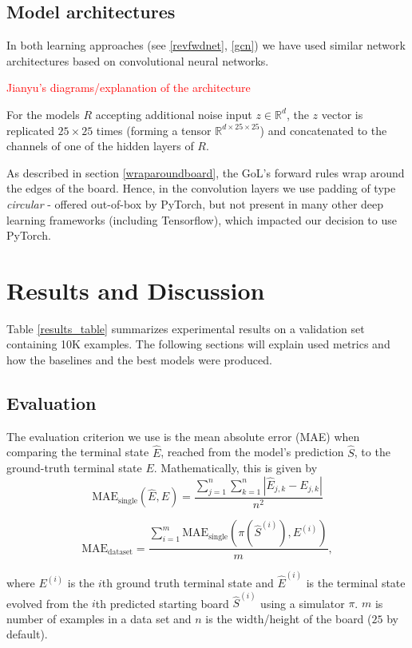 \documentclass[conference]{IEEEtran}
\newcommand\todo[1]{\textcolor{red}{#1}}
\begin{document}
\subsection{Model architectures}
In both learning approaches (see \ref{revfwdnet}, \ref{gcn}) we have used similar network architectures based on convolutional neural networks.

\todo{Jianyu's diagrams/explanation of the architecture}

For the models $R$ accepting additional noise input $z \in \mathbb{R}^d$, the $z$ vector is replicated $25 \times 25$ times (forming a tensor $\mathbb{R}^{d\times25\times25}$) and concatenated to the channels of one of the hidden layers of $R$.

As described in section \ref{wraparoundboard}, the GoL's forward rules wrap around the edges of the board. Hence, in the convolution layers we use padding of type {\it circular} - offered out-of-box by PyTorch, but not present in many other deep learning frameworks (including Tensorflow), which impacted our decision to use PyTorch.


\section{Results and Discussion}
\label{results}
Table \ref{results_table} summarizes experimental results on a validation set containing 10K examples. The following sections will explain used metrics and how the baselines and the best models were produced.

\subsection{Evaluation}
\label{evaluation}
The evaluation criterion we use is the mean absolute error (MAE) when comparing the terminal state $\hat{E}$, reached from the model's prediction $\hat{S}$, to the ground-truth terminal state $E$. Mathematically, this is given by
$$\mathrm{MAE}_{\text{single}}(\hat E, E) = \frac{ \sum_{j=1}^{n}\sum_{k=1}^{n}|\hat E_{j,k} - E_{j,k}|}{n^2}$$

$$\mathrm{MAE}_{\text{dataset}} = \frac{\sum_{i=1}^{m} \mathrm{MAE}_{\text{single}}(\pi(\hat S^{(i)}), E^{(i)})}{m},$$


where $E^{(i)}$ is the $i$th ground truth terminal state and $\hat E^{(i)}$ is the terminal state evolved from the $i$th predicted starting board $\hat S^{(i)}$ using a simulator $\pi$. $m$ is number of examples in a data set and $n$ is the width/height of the board ($25$ by default).
\end{document}
